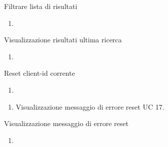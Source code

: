 \begin{usecase}{14}{Filtrare lista di risultati}\label{uc:}
    \usecasepre{}
    \usecasedesc{}
    \usecasepost{}

    \usecasemain{}
        \begin{enumerate}
            \item 
        \end{enumerate}

\end{usecase}

\begin{usecase}{15}{Visualizzazione risultati ultima ricerca}\label{uc:}
    \usecasepre{}
    \usecasedesc{}
    \usecasepost{}

    \usecasemain{}
        \begin{enumerate}
            \item 
        \end{enumerate}

\end{usecase}

\begin{usecase}{16}{Reset client-id corrente}\label{uc:}
    \usecasepre{}
    \usecasedesc{}
    \usecasepost{}

    \usecasemain{}
        \begin{enumerate}
            \item 
        \end{enumerate}

    \usecaseext{}
        \begin{enumerate}
            \item Visualizzazione messaggio di errore reset UC 17.
        \end{enumerate}

\end{usecase}


\begin{usecase}{17}{Visualizzazione messaggio di errore reset}\label{uc:}
    \usecasepre{}
    \usecasedesc{}
    \usecasepost{}

    \usecasemain{}
        \begin{enumerate}
            \item 
        \end{enumerate}

\end{usecase}


